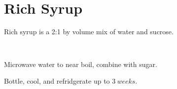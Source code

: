 \section[Rich Syrup]{Rich Syrup}\label{richSyrup}

\begin{recipestats}[
        servings=$\twothird~C$,
        preptime=5~\minute,
        original=\citefield{cocktailSeminars2021}{title}~\cite{cocktailSeminars2021},
    ]
\end{recipestats}

\begin{recipeabstract}
    Rich syrup is a 2:1 by volume mix of water and sucrose.
\end{recipeabstract}

\begin{ingredientcolumns}[1]
    \begin{ingredientblock}
        \\
    \end{ingredientblock}
\end{ingredientcolumns}

\begin{preparation}
\item Microwave water to near boil, combine with sugar.
\item Bottle, cool, and refridgerate up to $3~weeks$.
\end{preparation}

\recipeend

